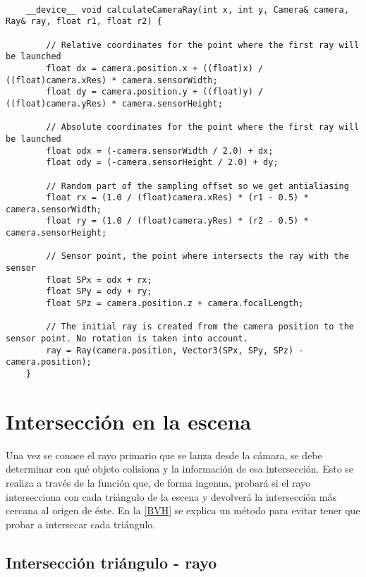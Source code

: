 \begin{minipage}[c]{0.95\textwidth}
\begin{lstlisting}[label={cod:cameraray}, caption={Trazado de rayo a cámara}]
	
	__device__ void calculateCameraRay(int x, int y, Camera& camera, Ray& ray, float r1, float r2) {

		// Relative coordinates for the point where the first ray will be launched
		float dx = camera.position.x + ((float)x) / ((float)camera.xRes) * camera.sensorWidth;
		float dy = camera.position.y + ((float)y) / ((float)camera.yRes) * camera.sensorHeight;

		// Absolute coordinates for the point where the first ray will be launched
		float odx = (-camera.sensorWidth / 2.0) + dx;
		float ody = (-camera.sensorHeight / 2.0) + dy;

		// Random part of the sampling offset so we get antialiasing
		float rx = (1.0 / (float)camera.xRes) * (r1 - 0.5) * camera.sensorWidth;
		float ry = (1.0 / (float)camera.yRes) * (r2 - 0.5) * camera.sensorHeight;

		// Sensor point, the point where intersects the ray with the sensor
		float SPx = odx + rx;
		float SPy = ody + ry;
		float SPz = camera.position.z + camera.focalLength;

		// The initial ray is created from the camera position to the sensor point. No rotation is taken into account.
		ray = Ray(camera.position, Vector3(SPx, SPy, SPz) - camera.position);
	}

\end{lstlisting}
\end{minipage}
	
\section{Intersección en la escena}
\label{sec:throwray}

Una vez se conoce el rayo primario que se lanza desde la cámara, se debe determinar con qué objeto colisiona y la información de esa intersección. Esto se realiza a través de la función  que, de forma ingenua, probará si el rayo intersecciona con cada triángulo de la escena y devolverá la intersección más cercana al origen de éste. En la \autoref{BVH} se explica un método para evitar tener que probar a intersecar cada triángulo.

\subsection{Intersección triángulo - rayo}
\label{subsec:triintersection}
	
